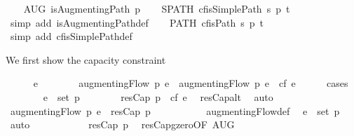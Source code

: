 \begin{isabellebody}
\ \ \isamarkupfalse%
\ AUG{\isacharcolon}\ {\isachardoublequoteopen}isAugmentingPath\ p{\isachardoublequoteclose}\isanewline
\ \ \isamarkupfalse%
\ SPATH{\isacharcolon}\ {\isachardoublequoteopen}cf{\isachardot}isSimplePath\ s\ p\ t{\isachardoublequoteclose}\ \isamarkupfalse%
\ {\isacharparenleft}simp\ add{\isacharcolon}\ isAugmentingPath{\isacharunderscore}def{\isacharparenright}\isanewline
\ \ \isamarkupfalse%
\ PATH{\isacharcolon}\ {\isachardoublequoteopen}cf{\isachardot}isPath\ s\ p\ t{\isachardoublequoteclose}\ \isamarkupfalse%
\ {\isacharparenleft}simp\ add{\isacharcolon}\ cf{\isachardot}isSimplePath{\isacharunderscore}def{\isacharparenright}\isanewline
\isanewline
\ \ \isacommand{{\isacharbraceleft}}\isamarkupfalse%
%
\begin{isamarkuptext}%
We first show the capacity constraint%
\end{isamarkuptext}\isamarkuptrue%
\ \ \ \ \isamarkupfalse%
\ e\isanewline
\ \ \ \ \isamarkupfalse%
\ {\isachardoublequoteopen}{}\ {\isasymle}\ {\isacharparenleft}augmentingFlow\ p{\isacharparenright}\ e\ {\isasymand}\ {\isacharparenleft}augmentingFlow\ p{\isacharparenright}\ e\ {\isasymle}\ cf\ e{\isachardoublequoteclose}\isanewline
\ \ \ \ \isamarkupfalse%
\ cases\ \isanewline
\ \ \ \ \ \ \isamarkupfalse%
\ {\isachardoublequoteopen}e\ {\isasymin}\ set\ p{\isachardoublequoteclose}\isanewline
\ \ \ \ \ \ \isamarkupfalse%
\ {\isachardoublequoteopen}resCap\ p\ {\isasymle}\ cf\ e{\isachardoublequoteclose}\ \isamarkupfalse%
\ resCap{\isacharunderscore}alt\ \isamarkupfalse%
\ auto\isanewline
\ \ \ \ \ \ \isamarkupfalse%
\ \ \isamarkupfalse%
\ {\isachardoublequoteopen}{\isacharparenleft}augmentingFlow\ p{\isacharparenright}\ e\ {\isacharequal}\ resCap\ p{\isachardoublequoteclose}\ \isanewline
\ \ \ \ \ \ \ \ \isamarkupfalse%
\ augmentingFlow{\isacharunderscore}def\ \isamarkupfalse%
\ {\isacartoucheopen}e\ {\isasymin}\ set\ p{\isacartoucheclose}\ \isamarkupfalse%
\ auto\isanewline
\ \ \ \ \ \ \isamarkupfalse%
\ \isamarkupfalse%
\ {\isachardoublequoteopen}{}\ {\isacharless}\ resCap\ p{\isachardoublequoteclose}\ \isamarkupfalse%
\ resCap{\isacharunderscore}gzero{\isacharbrackleft}OF\ AUG{\isacharbrackright}\ \isamarkupfalse%

\end{isabellebody}
